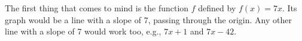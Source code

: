 The first thing that comes to mind is the function $f$ defined by
$f(x)=7x$. Its graph would be a line with a slope of 7,
passing through the origin. Any other line with a slope of 7 would work too, e.g.,
$7x+1$ and $7x-42$.
